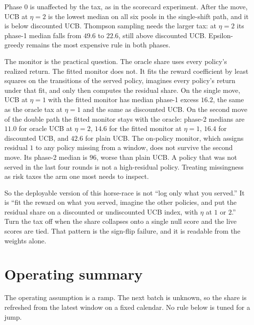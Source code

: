 \documentclass[11pt]{article}
\begin{document}
Phase 0 is unaffected by the tax, as in the scorecard experiment.
After the move, UCB at \(\eta=2\) is the lowest median on all six pools in the single-shift path, and it is below discounted UCB.
Thompson sampling needs the larger tax: at \(\eta=2\) its phase-1 median falls from \(49.6\) to \(22.6\), still above discounted UCB.
Epsilon-greedy remains the most expensive rule in both phases.

The monitor is the practical question.
The oracle share uses every policy's realized return.
The fitted monitor does not.
It fits the reward coefficient by least squares on the transitions of the served policy, imagines every policy's return under that fit, and only then computes the residual share.
On the single move, UCB at \(\eta=1\) with the fitted monitor has median phase-1 excess \(16.2\), the same as the oracle tax at \(\eta=1\) and the same as discounted UCB.
On the second move of the double path the fitted monitor stays with the oracle: phase-2 medians are \(11.0\) for oracle UCB at \(\eta=2\), \(14.6\) for the fitted monitor at \(\eta=1\), \(16.4\) for discounted UCB, and \(42.6\) for plain UCB.
The on-policy monitor, which assigns residual \(1\) to any policy missing from a window, does not survive the second move.
Its phase-2 median is \(96\), worse than plain UCB.
A policy that was not served in the last four rounds is not a high-residual policy.
Treating missingness as risk taxes the arm one most needs to inspect.

So the deployable version of this horse-race is not ``log only what you served.''
It is ``fit the reward on what you served, imagine the other policies, and put the residual share on a discounted or undiscounted UCB index, with \(\eta\) at \(1\) or \(2\).''
Turn the tax off when the share collapses onto a single null score and the live scores are tied.
That pattern is the sign-flip failure, and it is readable from the weights alone.

\section{Operating summary}

The operating assumption is a ramp.
The next batch is unknown, so the share is refreshed from the latest window on a fixed calendar.
No rule below is tuned for a jump.
\end{document}
